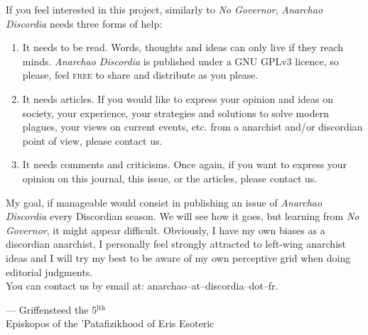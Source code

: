 \documentclass[12pt, onecolumn, letterpaper, oneside]{book}
\begin{document}
If you feel interested in this project, similarly to \emph{No Governor}, \emph{Anarchao Discordia} needs three forms of help:
\begin{enumerate}
\item It needs to be read. Words, thoughts and ideas can only live if they reach minds. \emph{Anarchao Discordia} is published under a GNU GPLv3 licence, so please, feel \textsc{free} to share and distribute as you please.
\item It needs articles. If you would like to express your opinion and ideas on society, your experience, your strategies and solutions to solve modern plagues, your views on current events, etc. from a anarchist and/or discordian point of view, please contact us.
\item It needs comments and criticisms. Once again, if you want to express your opinion on this journal, this issue, or the articles, please contact us.
\end{enumerate}

My goal, if manageable would consist in publishing an issue of \emph{Anarchao Discordia} every Discordian season. We will see how it goes, but learning from \emph{No Governor}, it might appear difficult. Obviously, I have my own biases as a discordian anarchist, I personally feel strongly attracted to left-wing anarchist ideas and I will try my best to be aware of my own perceptive grid when doing editorial judgments.\\

You can contact us by email at: anarchao--at--discordia--dot--fr.

\par\begin{flushright} --- Griffensteed the 5$^\text{lth}$\\ Episkopos of the 'Patafizikhood of Eris Esoteric\end{flushright}










\end{document}
